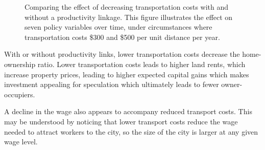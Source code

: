 \begin{figure}[h!tb]
\caption[Comparing the effect of decreasing transportation costs with and without a productivity linkage]{Comparing the effect of decreasing transportation costs with and without a productivity linkage. This figure illustrates the effect on seven policy variables over time,  under circumstances where transportation costs \$300 and \$500 per unit distance per year.}
\label{fig:Productivity_link_W-WO-transportation-cost}
\end{figure}
With or without productivity links, lower transportation costs decrease the home-ownership ratio. 
Lower transportation costs leads to higher land rents, which increase  property prices, leading to higher expected capital gains which makes investment appealing for speculation which ultimately leads to fewer owner-occupiers.

A decline in the wage also appears to accompany reduced transport costs. This may be understood by noticing that lower transport costs reduce the wage needed to attract workers to the city, so the size of the city is larger at any given wage level. %


